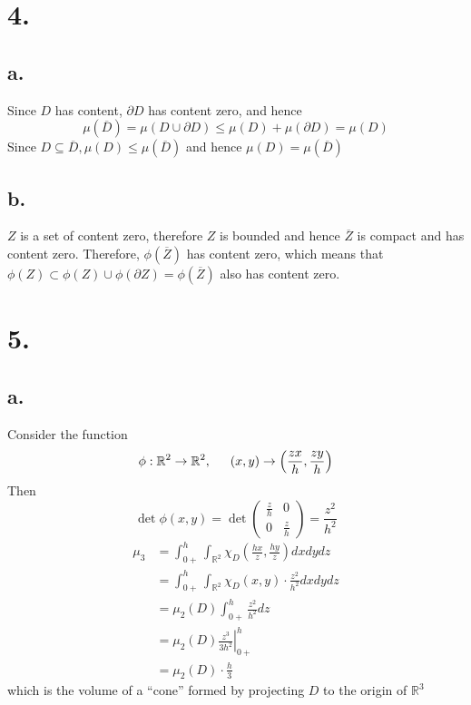 \documentclass[11pt]{article}
\begin{document}
\section*{4.}
\subsection*{a.}
Since $D$ has content, $\partial D$ has content zero, and hence
\[
    \mu(\overline{D}) = \mu(D \cup \partial D) \le \mu(D) + \mu(\partial D) = \mu(D)    
\]
Since $D \subseteq \overline{D}, \mu(D) \le \mu(\overline{D})$ and hence $\mu(D) = \mu(\overline{D})$
\subsection*{b.}
$Z$ is a set of content zero, therefore $Z$ is bounded and 
hence $\overline{Z}$ is compact and has content zero. 
Therefore, $\phi(\overline{Z})$ has content zero, which means that 
$\phi(Z) \subset \phi(Z) \cup \phi(\partial Z) = \phi(\overline{Z})$ also has content zero.
\pagebreak
\section*{5.}
\subsection*{a.}
Consider the function 
\[
    \phi: \mathbb{R}^2 \to \mathbb{R}^2, \indent (x,y) \to \left(\frac{zx}{h}, \frac{zy}{h} \right)    
\]
Then 
\[
    \det \phi(x,y) =
    \det 
    \begin{pmatrix}
        \frac{z}{h} & 0 \\
        0 & \frac{z}{h}
    \end{pmatrix}
    = \frac{z^2}{h^2}  
\]
\begin{equation*}
    \begin{aligned}
        \mu_3 
        &= \int_{0+}^h \int_{\mathbb{R}^2} \chi_D  \left(\frac{hx}{z}, \frac{hy}{z} \right) dxdydz \\
        &= \int_{0+}^h \int_{\mathbb{R}^2} \chi_D (x,y) \cdot \frac{z^2}{h^2} dxdydz \\
        &= \mu_2(D) \int_{0+}^h \frac{z^2}{h^2} dz \\
        &= \mu_2(D) \left.\frac{z^3}{3h^2} \right|_{0+}^{h} \\
        &= \mu_2(D) \cdot \frac{h}{3}
    \end{aligned}
\end{equation*}
which is the volume of a “cone” formed by projecting $D$ to the origin of $\mathbb{R}^3$
\end{document}
